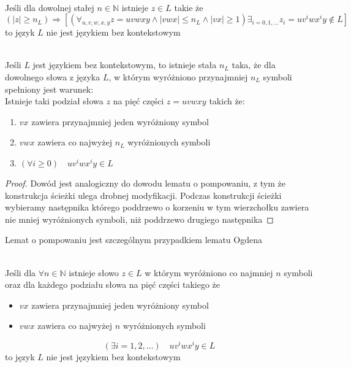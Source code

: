 	\begin{lemat}~\\
		Jeśli dla dowolnej stałej $n\in\mathbb{N}$ istnieje $z\in L$ takie że
		\begin{equation}
			(|z| \geqslant n_L) \Rightarrow [( \forall_{u,v,w,x,y} z = uvwxy \wedge |vwx| \leqslant n_L \wedge |vx| \geqslant 1) \exists_{i=0,1,\dots} z_i = uv^iwx^iy \not\in L]
		\end{equation}
		to język $L$ nie jest językiem bez kontekstowym
	\end{lemat}			
		
	\begin{lemat}~\\
		Jeśli $L$ jest językiem bez kontekstowym, to istnieje stała $n_L$ taka, że dla dowolnego słowa z języka $L$, w którym wyróżniono przynajmniej
		$n_L$ symboli spełniony jest warunek:\\
		Istnieje taki podział słowa $z$ na pięć części $z = uvwxy$ takich że:
		\begin{enumerate}
			\item $vx$ zawiera przynajmniej jeden wyróżniony symbol
			\item $vwx$ zawiera co najwyżej $n_L$ wyróżnionych symboli
			\item $(\forall i\geqslant 0) \quad uv^iwx^iy \in L$
		\end{enumerate}
		
		\begin{proof}
			Dowód jest analogiczny do dowodu lematu o pompowaniu, z tym że konstrukcja ścieżki ulega drobnej modyfikacji.
			Podczas konstrukcji ścieżki wybieramy następnika którego poddrzewo o korzeniu w tym wierzchołku zawiera nie
			mniej wyróżnionych symboli, niż poddrzewo drugiego następnika
		\end{proof}			
		
		\begin{uwaga}
			Lemat o pompowaniu jest szczególnym przypadkiem lematu Ogdena
		\end{uwaga}
	\end{lemat}	
	
	\begin{lemat}~\\
		Jeśli dla $\forall n\in \mathbb{N}$ istnieje słowo $z \in L$ w którym wyróżniono co najmniej $n$ symboli oraz
		dla każdego podziału słowa na pięć części takiego że
		\begin{itemize}
			\item $vx$ zawiera przynajmniej jeden wyróżniony symbol
			\item $vwx$ zawiera co najwyżej $n$ wyróżnionych symboli
		\end{itemize}
		\begin{equation}
			(\exists i=1,2,\dots) \quad uv^iwx^iy \in L
		\end{equation}
		to język $L$ nie jest językiem bez kontekstowym
	\end{lemat}	


